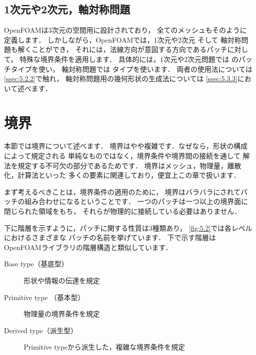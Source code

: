 \subsection{1次元や2次元，軸対称問題}
\label{ssec:5.1.4}
%
%
%
%
%
%
%
%
OpenFOAMは3次元の空間用に設計されており，
全てのメッシュもそのように定義します．
しかしながら，OpenFOAMでは，1次元や2次元
そして%
%
%
軸対称問題も解くことができ，
それには，法線方向が意図する方向であるパッチに対して，
特殊な境界条件を適用します．
具体的には，1次元や2次元問題では
%
%
のパッチタイプを使い，
軸対称問題では
%
%
タイプを使います．
両者の使用法については\autoref{ssec:5.2.2}で触れ，
軸対称問題用の幾何形状の生成法については
\autoref{ssec:5.3.3}において述べます．



\section{境界}
\label{sec:5.2}
%
本節では境界について述べます．
境界はやや複雑です．なぜなら，形状の構成によって規定される
単純なものではなく，境界条件や境界間の接続を通して
解法を規定する不可欠の部分であるためです．
境界はメッシュ，物理量，離散化，計算法といった
多くの要素に関連しており，便宜上この章で扱います．

まず考えるべきことは，境界条件の適用のために，
境界はバラバラにされてパッチの組み合わせになるということです．
一つのパッチは一つ以上の境界面に閉じられた領域をもち，
それらが物理的に接続している必要はありません．

下に階層を示すように，パッチに関する性質は3種類あり，
\autoref{fig:5.2}では各レベルにおけるさまざまな
パッチの名前を挙げています．
下で示す階層はOpenFOAMライブラリの階層構造と類似しています．
\begin{description}
 \item[Base type（基底型）]
            形状や情報の伝達を規定
 \item[Primitive type （基本型）]
            物理量の境界条件を規定
 \item[Derived type（派生型）]
            Primitive typeから派生した，複雑な境界条件を規定
\end{description}


